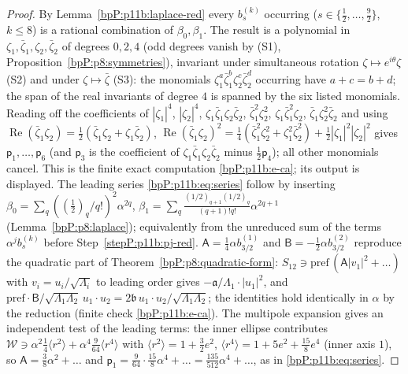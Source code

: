 \begin{proof}
\label{stepP:p11b:pj-red} By Lemma~\ref{bpP:p11b:laplace-red} every $b_s^{(k)}$ occurring ($s\in\{\tfrac12,\dots,\tfrac92\}$, $k\le 8$) is a rational combination of $\beta_0,\beta_1$. The result is a polynomial in $\zeta_1,\bar\zeta_1,\zeta_2,\bar\zeta_2$ of degrees $0,2,4$ (odd degrees vanish by (S1), Proposition~\ref{bpP:p8:symmetries}), invariant under simultaneous rotation $\zeta\mapsto e^{i\theta}\zeta$ (S2) and under $\zeta\mapsto\bar\zeta$ (S3): the monomials $\zeta_1^{a}\bar\zeta_1^{b}\zeta_2^{c}\bar\zeta_2^{d}$ occurring have $a+c=b+d$; the span of the real invariants of degree $4$ is spanned by the six listed monomials. Reading off the coefficients of $|\zeta_1|^4$, $|\zeta_2|^4$, $\zeta_1\bar\zeta_1\zeta_2\bar\zeta_2$, $\bar\zeta_1^2\zeta_2^2$, $\zeta_1\bar\zeta_1^2\zeta_2$, $\bar\zeta_1\zeta_2^2\bar\zeta_2$ and using $\operatorname{Re}(\bar\zeta_1\zeta_2)=\tfrac12(\bar\zeta_1\zeta_2+\zeta_1\bar\zeta_2)$, $\operatorname{Re}(\bar\zeta_1\zeta_2)^2=\tfrac14(\bar\zeta_1^2\zeta_2^2+\zeta_1^2\bar\zeta_2^2)+\tfrac12|\zeta_1|^2|\zeta_2|^2$ gives $\mathsf p_1,\dots,\mathsf p_6$ (and $\mathsf p_3$ is the coefficient of $\zeta_1\bar\zeta_1\zeta_2\bar\zeta_2$ minus $\tfrac12\mathsf p_4$); all other monomials cancel. This is the finite exact computation \ref{bpP:p11b:e-ca}; its output is displayed. The leading series \eqref{bpP:p11b:eq:series} follow by inserting $\beta_0=\sum_q((\tfrac12)_q/q!)^2\alpha^{2q}$, $\beta_1=\sum_q\frac{(1/2)_{q+1}(1/2)_q}{(q+1)!q!}\alpha^{2q+1}$ (Lemma~\ref{bpP:p8:laplace}); equivalently from the unreduced sum of the terms $\alpha^jb_s^{(k)}$ before Step~\ref{stepP:p11b:pj-red}.
\label{stepP:p11b:pj-cons} $\mathsf A=\frac14\alpha b_{3/2}^{(1)}$ and $\mathsf B=-\frac12\alpha b_{3/2}^{(2)}$ reproduce the quadratic part of Theorem~\ref{bpP:p8:quadratic-form}: $S_{12}\ni\mathrm{pref}\,(\mathsf A|v_1|^2+\dots)$ with $v_i=u_i/\sqrt{\Lambda_i}$ to leading order gives $-\mathfrak a/\Lambda_1\cdot|u_1|^2$, and $\mathrm{pref}\cdot\mathsf B/\sqrt{\Lambda_1\Lambda_2}\,u_1\cdot u_2=2\mathfrak b\,u_1\cdot u_2/\sqrt{\Lambda_1\Lambda_2}$; the identities hold identically in $\alpha$ by the reduction (finite check \ref{bpP:p11b:e-ca}). The multipole expansion gives an independent test of the leading terms: the inner ellipse contributes $\mathcal W\ni\alpha^2\tfrac14\langle r^2\rangle+\alpha^4\tfrac9{64}\langle r^4\rangle$ with $\langle r^2\rangle=1+\tfrac32e^2$, $\langle r^4\rangle=1+5e^2+\tfrac{15}8e^4$ (inner axis $1$), so $\mathsf A=\tfrac38\alpha^2+\dots$ and $\mathsf p_1=\tfrac9{64}\cdot\tfrac{15}8\alpha^4+\dots=\tfrac{135}{512}\alpha^4+\dots$, as in \eqref{bpP:p11b:eq:series}.
\end{proof}

